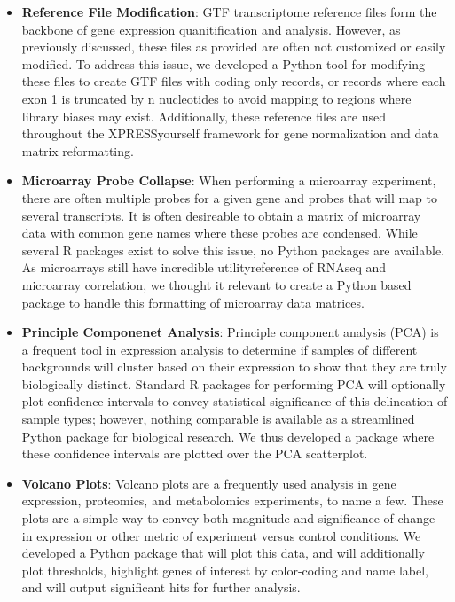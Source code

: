 \documentclass[11pt, a4paper, oneside]{article}
\begin{document}
\begin{itemize}
  \item \textbf{Reference File Modification}: GTF transcriptome reference files form the backbone of gene expression quanitification and analysis. However, as previously discussed, these files as provided are often not customized or easily modified. To address this issue, we developed a Python tool for modifying these files to create GTF files with coding only records, or records where each exon 1 is truncated by n nucleotides to avoid mapping to regions where library biases may exist. Additionally, these reference files are used throughout the XPRESSyourself framework for gene normalization and data matrix reformatting.
  \item \textbf{Microarray Probe Collapse}: When performing a microarray experiment, there are often multiple probes for a given gene and probes that will map to several transcripts. It is often desireable to obtain a matrix of microarray data with common gene names where these probes are condensed. While several R packages exist to solve this issue{}, no Python packages are available. As microarrays still have incredible utility{reference of RNAseq and microarray correlation}, we thought it relevant to create a Python based package to handle this formatting of microarray data matrices.
  \item \textbf{Principle Componenet Analysis}: Principle component analysis (PCA) is a frequent tool in expression analysis to determine if samples of different backgrounds will cluster based on their expression to show that they are truly biologically distinct. Standard R packages for performing PCA will optionally plot confidence intervals to convey statistical significance of this delineation of sample types; however, nothing comparable is available as a streamlined Python package for biological research. We thus developed a package where these confidence intervals are plotted over the PCA scatterplot.
  \item \textbf{Volcano Plots}: Volcano plots are a frequently used analysis in gene expression, proteomics, and metabolomics experiments, to name a few. These plots are a simple way to convey both magnitude and significance of change in expression or other metric of experiment versus control conditions. We developed a Python package that will plot this data, and will additionally plot thresholds, highlight genes of interest by color-coding and name label, and will output significant hits for further analysis.
\end{itemize}
\end{document}
